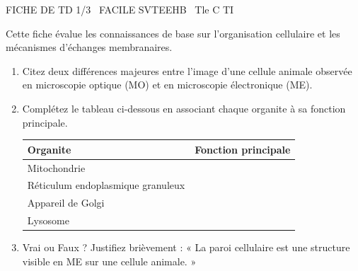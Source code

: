 \documentclass[11pt]{article}
\begin{document}
\begin{tcolorbox}[enhanced,colback=popink,colframe=popink,arc=10pt,boxrule=0pt,left=12pt,right=12pt,top=9pt,bottom=9pt]
{\color{white}\popxbold\small FICHE DE TD 1/3 \textbullet\ FACILE \hfill SVTEEHB \textbullet\ Tle C TI\par}
\end{tcolorbox}
\vspace{4pt}
Cette fiche évalue les connaissances de base sur l'organisation cellulaire et les mécanismes d'échanges membranaires.

\begin{exercice}
\begin{enumerate}
    \item Citez deux différences majeures entre l'image d'une cellule animale observée en microscopie optique (MO) et en microscopie électronique (ME).
    \item Complétez le tableau ci-dessous en associant chaque organite à sa fonction principale.
    \begin{tabular}{|l|l|}
    \hline
    \textbf{Organite} & \textbf{Fonction principale} \\
    \hline
    Mitochondrie & \\
    \hline
    Réticulum endoplasmique granuleux & \\
    \hline
    Appareil de Golgi & \\
    \hline
    Lysosome & \\
    \hline
    \end{tabular}
    \item Vrai ou Faux ? Justifiez brièvement : « La paroi cellulaire est une structure visible en ME sur une cellule animale. »
\end{enumerate}
\end{exercice}
\end{document}
